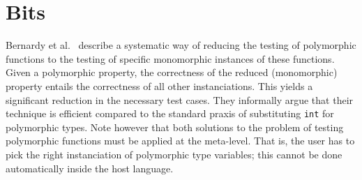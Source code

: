 \section{Bits}
Bernardy et al.~\cite{DBLP:conf/esop/BernardyJC10} describe a
systematic way of reducing the testing of polymorphic functions to the
testing of specific monomorphic instances of these functions.
%
Given a polymorphic property, the correctness of the reduced
(monomorphic) property entails the correctness of all other
instanciations. This yields a significant reduction in the necessary
test cases.
%
They informally argue that their technique is efficient compared to
the standard praxis of substituting \texttt{int} for polymorphic
types.
%
Note however that both solutions to the problem of testing polymorphic
functions must be applied at the meta-level. That is, the user has to
pick the right instanciation of polymorphic type variables; this
cannot be done automatically inside the host language.
